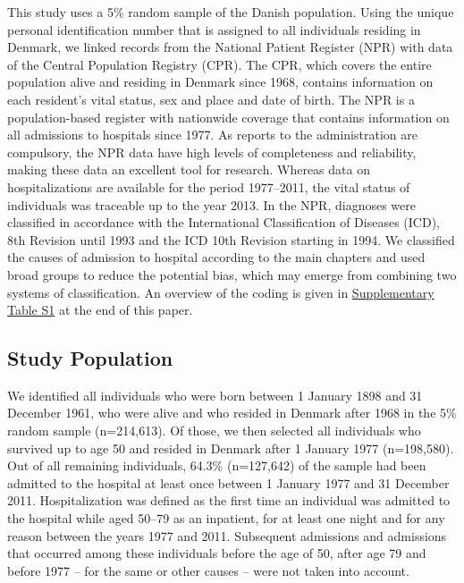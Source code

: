 This study uses a 5\% random sample of the Danish population. 
Using the unique personal identification number that is assigned 
to all individuals residing in Denmark,\citep{thygesen2011} we 
linked records from the National Patient Register (NPR) with 
data of the Central Population Registry (CPR). The CPR, which 
covers the entire population alive and residing in Denmark since 
1968, contains information on each resident's vital status, sex 
and place and date of birth.\citep{pedersen2011} The NPR is a 
population-based register with nationwide coverage that contains 
information on all admissions to hospitals since 1977.\citep{lynge2011} 
As reports to the administration are compulsory, the NPR data 
have high levels of completeness and reliability, making these 
data an excellent tool for research.\citep{andersen1999} Whereas 
data on hospitalizations are available for the period 1977--2011, 
the vital status of individuals was traceable up to the year 
2013. In the NPR, diagnoses were classified in accordance with 
the International Classification of Diseases (ICD), 8th Revision 
until 1993 and the ICD 10th Revision starting in 1994.\citep{schmidt2014} 
We classified the causes of admission to hospital according to 
the main chapters and used broad groups to reduce the potential 
bias, which may emerge from combining two systems of classification. 
An overview of the coding is given in \hyperref[ch2:tabS1]{Supplementary Table S1} 
at the end of this paper.\\

\subsection{Study Population}

We identified all individuals who were born between 1 January 1898 
and 31 December 1961, who were alive and who resided in Denmark 
after 1968 in the 5\% random sample (n=214,613). Of those, we then 
selected all individuals who survived up to age 50 and resided in 
Denmark after 1 January 1977 (n=198,580). Out of all remaining 
individuals, 64.3\% (n=127,642) of the sample had been admitted 
to the hospital at least once between 1 January 1977 and 31 December 
2011. Hospitalization was defined as the first time an individual 
was admitted to the hospital while aged 50--79 as an inpatient, 
for at least one night and for any reason between the years 1977 
and 2011. Subsequent admissions and admissions that occurred among 
these individuals before the age of 50, after age 79 and before 1977 
-- for the same or other causes -- were not taken into account.

